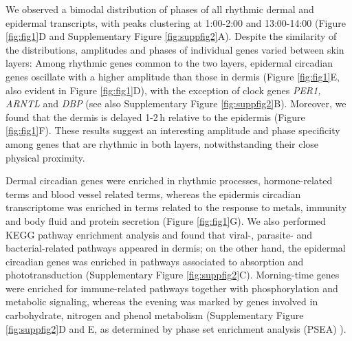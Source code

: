 We observed a bimodal distribution of phases of all rhythmic dermal and epidermal transcripts, with peaks clustering at 1:00-2:00 and 13:00-14:00 (Figure \ref{fig:fig1}D and Supplementary Figure \ref{fig:suppfig2}A). Despite the similarity of the distributions, amplitudes and phases of individual genes varied between skin layers: Among rhythmic genes common to the two layers,  epidermal circadian genes oscillate with a higher amplitude than those in dermis (Figure \ref{fig:fig1}E, also evident in Figure \ref{fig:fig1}D), with the exception of clock genes \textit{PER1, ARNTL} and \textit{DBP} (see also Supplementary Figure \ref{fig:suppfig2}B). Moreover, we found that the dermis is delayed 1-2\,h relative to the epidermis (Figure \ref{fig:fig1}F). These results suggest an interesting amplitude and phase specificity among genes that are rhythmic in both layers, notwithstanding their close physical proximity.

Dermal circadian genes were enriched in rhythmic processes, hormone-related terms and blood vessel related terms, whereas the epidermis circadian transcriptome was enriched in terms related to the response to metals, immunity and body fluid and protein secretion (Figure \ref{fig:fig1}G). We also performed KEGG pathway enrichment analysis and found that viral-, parasite- and bacterial-related pathways appeared in dermis; on the other hand, the epidermal circadian genes was enriched in pathways associated to absorption and phototransduction (Supplementary Figure \ref{fig:suppfig2}C). Morning-time genes were enriched for immune-related pathways together with phosphorylation and metabolic signaling, whereas the evening was marked by genes involved in carbohydrate, nitrogen and phenol metabolism (Supplementary Figure \ref{fig:suppfig2}D and E, as determined by phase set enrichment analysis (PSEA) \cite{Zhang2016}). %


